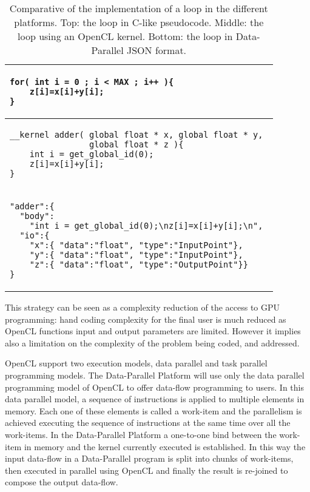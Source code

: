 \documentclass[conference]{IEEEtran}
\newcommand{\ist}{230pt}
\begin{document}
\begin{table}[t]
\begin{center}
\begin{tabular}{|p{\ist}|}
\hline\scriptsize
\begin{verbatim}
for( int i = 0 ; i < MAX ; i++ ){
    z[i]=x[i]+y[i];
}
\end{verbatim}
\\ \hline\scriptsize
\begin{verbatim}
__kernel adder( global float * x, global float * y, 
                global float * z ){
    int i = get_global_id(0);
    z[i]=x[i]+y[i];
}
\end{verbatim}
\\ \hline\scriptsize
\begin{verbatim}
"adder":{
  "body":
    "int i = get_global_id(0);\nz[i]=x[i]+y[i];\n",
  "io":{
    "x":{ "data":"float", "type":"InputPoint"},
    "y":{ "data":"float", "type":"InputPoint"},
    "z":{ "data":"float", "type":"OutputPoint"}}
}
\end{verbatim}
\\ \hline
\end{tabular}
\end{center}
\caption{Comparative of the implementation of a loop in the different platforms.
  Top: the loop in C-like pseudocode. Middle: the loop using an OpenCL kernel.
  Bottom: the loop in Data-Parallel JSON format.}
\label{tab:compare}
\end{table}

This strategy can be seen as a complexity reduction of the access to GPU
programming\cite{Ueng:2008:CRG:1485701.1485702}: hand coding complexity for the
final user is much reduced as OpenCL functions input and output parameters are
limited. However it implies also a limitation on the complexity of the problem
being coded, and addressed.

OpenCL support two execution models, data parallel and task parallel programming
models.  The Data-Parallel Platform will use only the data parallel programming
model of OpenCL to offer data-flow programming to users.  In this data parallel
model, a sequence of instructions is applied to multiple elements in memory.
Each one of these elements is called a work-item and the parallelism is achieved
executing the sequence of instructions at the same time over all the work-items.
In the Data-Parallel Platform a one-to-one bind between the work-item in memory
and the kernel currently executed is established.  In this way the input
data-flow in a Data-Parallel program is split into chunks of work-items, then
executed in parallel using OpenCL and finally the result is re-joined to compose
the output data-flow.
\end{document}
